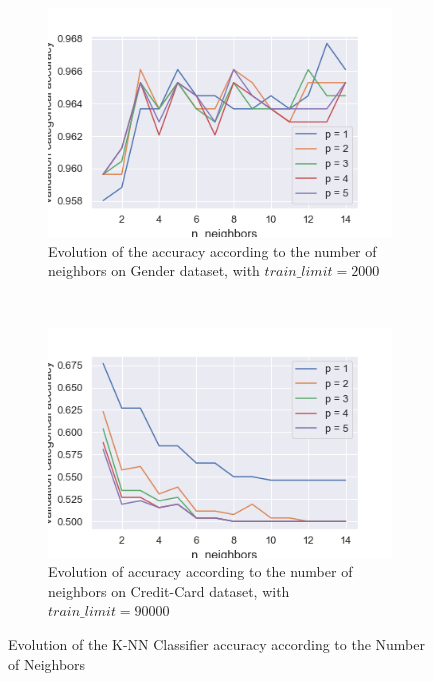 \documentclass[10pt]{article}
\begin{document}
		\paragraph*{}
			\begin{figure}[h]
				\centering
				\begin{subfigure}[]{0.45\columnwidth}
					\centering
					\includegraphics[width=\linewidth]{../graphics/knn_gender_neighbors.png}
					\caption{Evolution of the accuracy according to the number of neighbors on Gender dataset, with $train\_limit = 2000$}
					\label{knn:g_neighbors}
				\end{subfigure}
				~
				\begin{subfigure}[]{0.45\columnwidth}
					\centering
					\includegraphics[width=\linewidth]{../graphics/knn_creditcard_neighbors.png}
					\caption{Evolution of accuracy according to the number of neighbors on Credit-Card dataset, with $train\_limit = 90000$}
					\label{knn:cc_neighbors}
				\end{subfigure}
				\caption{Evolution of the K-NN Classifier accuracy according to the Number of Neighbors}
				\label{knn:neighbors}
			\end{figure}
\end{document}
